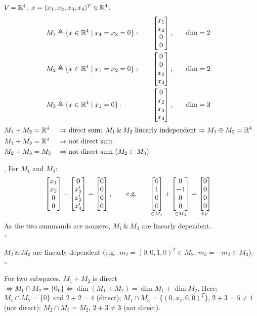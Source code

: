 \begin{example}
$\mathcal{V}=\mathbb{R}^4$, \quad $x=(x_1,x_2,x_3,x_4)^T\in\mathbb{R}^4$.
\begin{alignat*}{3}
M_1&\triangleq\{x\in\mathbb{R}^4\mid x_4=x_3=0\}: &\quad &\begin{bmatrix}x_1\\x_2\\0\\0\end{bmatrix}, &\quad \dim&=2\\
M_2&\triangleq\{x\in\mathbb{R}^4\mid x_1=x_2=0\}: & &\begin{bmatrix}0\\0\\x_3\\x_4\end{bmatrix}, & \dim&=2\\
M_3&\triangleq\{x\in\mathbb{R}^4\mid x_1=0\}: & &\begin{bmatrix}0\\x_2\\x_3\\x_4\end{bmatrix}, & \dim&=3
\end{alignat*}
\begin{align*}
M_1+M_2&=\mathbb{R}^4 && \Rightarrow \text{direct sum: } M_1\,\&\,M_2 \text{ linearly independent} \Rightarrow M_1\oplus M_2=\mathbb{R}^4\\
M_1+M_3&=\mathbb{R}^4 && \Rightarrow \text{not direct sum}\\
M_2+M_3&=M_3 && \Rightarrow \text{not direct sum } (M_2\subset M_3)
\end{align*}

\sep
For $M_1$ and $M_3$:
\[
\begin{bmatrix}x_1\\x_2\\0\\0\end{bmatrix}+\begin{bmatrix}0\\x_2'\\x_3'\\x_4'\end{bmatrix}=\begin{bmatrix}0\\0\\0\\0\end{bmatrix},
\qquad\text{e.g.}\qquad
\underset{\in M_1}{\begin{bmatrix}0\\1\\0\\0\end{bmatrix}}+\underset{\in M_3}{\begin{bmatrix}0\\-1\\0\\0\end{bmatrix}}=\underset{0_V}{\begin{bmatrix}0\\0\\0\\0\end{bmatrix}}
\]
As the two summands are nonzero, $M_1\,\&\,M_3$ are linearly dependent.\\
$\therefore$ 

$M_2\,\&\,M_3$ are linearly dependent (e.g.\ $m_2=(0,0,1,0)^T\in M_2$, $m_3=-m_2\in M_3$).\\
$\therefore$ 
\begin{insight}
For two subspaces, $M_1+M_2$ is direct $\iff M_1\cap M_2=\{0_V\}\iff\dim(M_1+M_2)=\dim M_1+\dim M_2$. Here: $M_1\cap M_2=\{0\}$ and $2+2=4$ (direct); $M_1\cap M_3=\{(0,x_2,0,0)^T\}$, $2+3=5\ne4$ (not direct); $M_2\cap M_3=M_2$, $2+3\ne3$ (not direct).
\end{insight}
\end{example}

